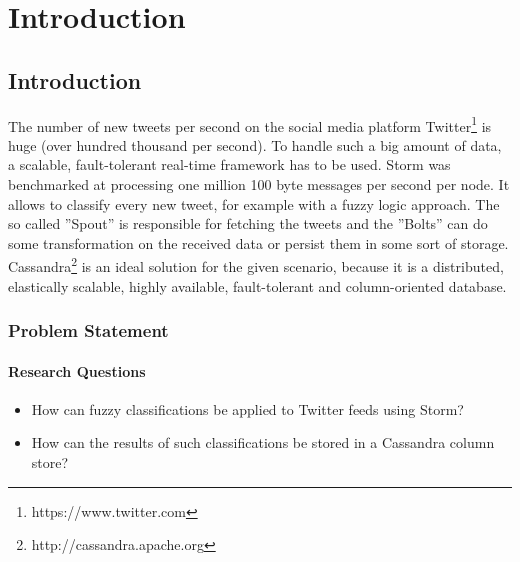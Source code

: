 \documentclass[a4paper]{report}
\begin{document}
  





\pagestyle{plain}
\newpage





\dominitoc
\tableofcontents
\newpage

\listoffigures

\listoftables

\lstlistoflistings

\chapter{Introduction}
\minitoc

\section{Introduction}

The number of new tweets per second on the social media platform Twitter\footnote{https://www.twitter.com} is huge (over hundred thousand per second). To handle such a big amount of data, a scalable, fault-tolerant real-time framework has to be used. Storm was benchmarked at processing one million 100 byte messages per second per node. It allows to classify every new tweet, for example with a fuzzy logic approach. The so called ''Spout'' is responsible for fetching the tweets and the ''Bolts'' can do some transformation on the received data or persist them in some sort of storage. Cassandra\footnote{http://cassandra.apache.org} is an ideal solution for the given scenario, because it is a distributed, elastically scalable, highly available, fault-tolerant and column-oriented database.

\subsection{Problem Statement}

\subsubsection{Research Questions}\label{research_questions}
\vspace{0.5cm}
\begin{itemize}
\item How can fuzzy classifications be applied to Twitter feeds using Storm?\cite{platemate}
\item How can the results of such classifications be stored in a Cassandra column store?
\end{itemize}
\end{document}
